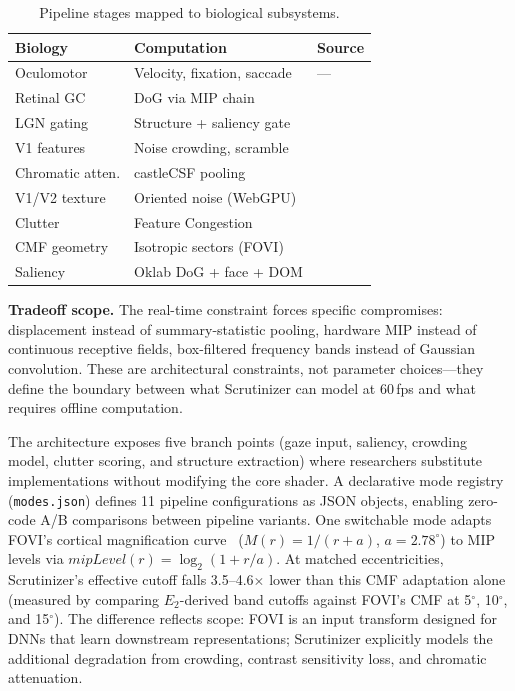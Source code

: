 \documentclass[10pt,twocolumn,letterpaper]{article}
\begin{document}
\begin{table}[H]
\centering
\caption{Pipeline stages mapped to biological subsystems.}\vspace{-2pt}
\label{tab:architecture}
\scriptsize
\begin{tabular}{@{}l p{2.8cm} l@{}}
\toprule
\textbf{Biology} & \textbf{Computation} & \textbf{Source} \\
\midrule
Oculomotor & Velocity, fixation, saccade & --- \\
Retinal GC & DoG via MIP chain & \citet{kuffler1953,rodieck1965} \\
LGN gating & Structure + saliency gate & \citet{mcalonan2008} \\
V1 features & Noise crowding, scramble & \citet{pelli2008} \\
Chromatic atten. & castleCSF pooling & \citet{ashraf2024} \\
V1/V2 texture & Oriented noise (WebGPU) & \citet{freeman2011} \\
Clutter & Feature Congestion & \citet{rosenholtz2007} \\
CMF geometry & Isotropic sectors (FOVI) & \citet{blauch2026} \\
Saliency & Oklab DoG + face + DOM & \citet{itti2001} \\
\bottomrule
\end{tabular}
\end{table}

\textbf{Tradeoff scope.} The real-time constraint forces specific compromises: displacement instead of summary-statistic pooling, hardware MIP instead of continuous receptive fields, box-filtered frequency bands instead of Gaussian convolution. These are architectural constraints, not parameter choices---they define the boundary between what Scrutinizer can model at 60\,fps and what requires offline computation.

The architecture exposes five branch points (gaze input, saliency, crowding model, clutter scoring, and structure extraction) where researchers substitute implementations without modifying the core shader. A declarative mode registry (\texttt{modes.json}) defines 11 pipeline configurations as JSON objects, enabling zero-code A/B comparisons between pipeline variants. One switchable mode adapts FOVI's cortical magnification curve~\citep{blauch2026} ($M(r) = 1/(r+a)$, $a{=}2.78^{\circ}$) to MIP levels via $\mathit{mipLevel}(r) = \log_2(1 + r/a)$. At matched eccentricities, Scrutinizer's effective cutoff falls 3.5--4.6$\times$ lower than this CMF adaptation alone (measured by comparing $E_2$-derived band cutoffs against FOVI's CMF at 5$^{\circ}$, 10$^{\circ}$, and 15$^{\circ}$). The difference reflects scope: FOVI is an input transform designed for DNNs that learn downstream representations; Scrutinizer explicitly models the additional degradation from crowding, contrast sensitivity loss, and chromatic attenuation.
\end{document}
